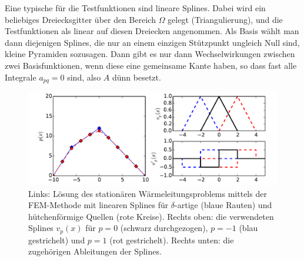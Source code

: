 Eine typische für die Testfunktionen sind lineare Splines. Dabei wird
ein beliebiges Dreiecksgitter über den Bereich $\Omega$ gelegt
(Triangulierung), und die Testfunktionen als linear auf diesen
Dreiecken angenommen. Als Basis wählt man dann diejenigen Splines, die
nur an einem einzigen Stützpunkt ungleich Null sind, kleine Pyramiden
sozusagen. Dann gibt es nur dann Wechselwirkungen zwischen zwei
Basisfunktionen, wenn diese eine gemeinsame Kante haben, so dass fast
alle Integrale $a_{pq}=0$ sind, also $A$ dünn besetzt.

\begin{figure}
	\includegraphics[width=\textwidth]{plots/fem}
	\caption{Links: Lösung des stationären Wärmeleitungsproblems mittels der FEM-Methode mit linearen Splines für $\delta$-artige (blaue Rauten) und hütchenförmige Quellen (rote Kreise). Rechts oben: die verwendeten Splines $v_p(x)$ für $p=0$ (schwarz durchgezogen), $p=-1$ (blau gestrichelt) und $p=1$ (rot gestrichelt). Rechts unten: die zugehörigen Ableitungen der Splines.}
	\label{fig:fem}
\end{figure}

